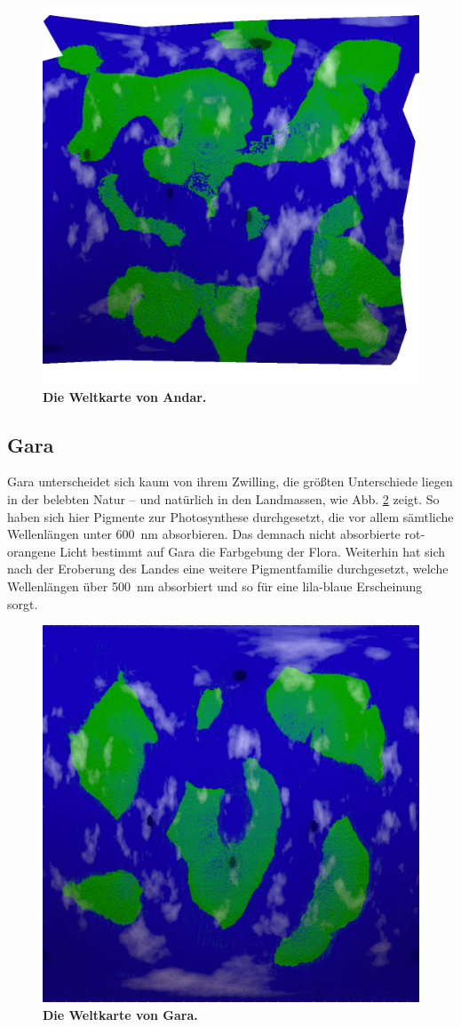 \begin{figure}[tbh]
	\centering
	\includegraphics[width=0.7\linewidth]{Abbildungen/Weltenbau/Welt/andar-map}
	\caption[Weltkarte von Andar]{\textbf{Die Weltkarte von Andar.}}
	\label{fig:andar-map}
\end{figure}


\subsection{Gara} \label{sec:planet-zwilling}
Gara unterscheidet sich kaum von ihrem Zwilling, die größten Unterschiede liegen in der belebten Natur -- und natürlich in den Landmassen, wie Abb. \ref{fig:gara-map} zeigt.
So haben sich hier Pigmente zur Photosynthese durchgesetzt, die vor allem sämtliche Wellenlängen unter \SI{600}{\nano\meter} absorbieren.
Das demnach nicht absorbierte rot-orangene Licht bestimmt auf Gara die Farbgebung der Flora.
Weiterhin hat sich nach der Eroberung des Landes eine weitere Pigmentfamilie durchgesetzt, welche Wellenlängen über \SI{500}{\nano\meter} absorbiert und so für eine lila-blaue Erscheinung sorgt.

\begin{figure}[tbh]
	\centering
	\includegraphics[width=0.7\linewidth]{Abbildungen/Weltenbau/Welt/gara-map}
	\caption[Weltkarte von Gara]{\textbf{Die Weltkarte von Gara.}}
	\label{fig:gara-map}
\end{figure}


